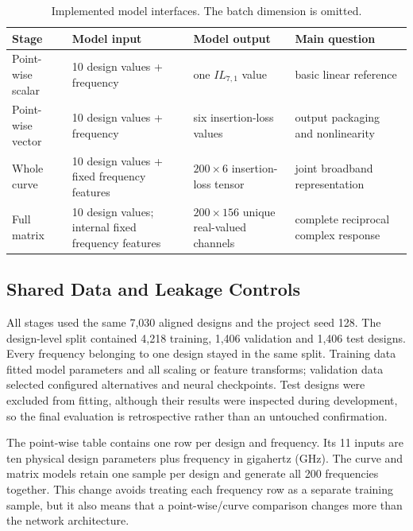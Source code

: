 \begin{table}[t]
    \caption{Implemented model interfaces. The batch dimension is omitted.}
    \label{tab:appendix-d-interfaces}
    \centering
    \scriptsize
    \begin{tabular}{@{}llll@{}}
        \toprule
        Stage & Model input & Model output & Main question \\
        \midrule
        Point-wise scalar
          & 10 design values + frequency
          & one $IL_{7,1}$ value
          & basic linear reference \\
        Point-wise vector
          & 10 design values + frequency
          & six insertion-loss values
          & output packaging and nonlinearity \\
        Whole curve
          & 10 design values + fixed frequency features
          & $200\times6$ insertion-loss tensor
          & joint broadband representation \\
        Full matrix
          & 10 design values; internal fixed frequency features
          & $200\times156$ unique real-valued channels
          & complete reciprocal complex response \\
        \bottomrule
    \end{tabular}
\end{table}

\subsection{Shared Data and Leakage Controls}
All stages used the same 7,030 aligned designs and the project seed 128. The
design-level split contained 4,218 training, 1,406 validation and 1,406 test
designs. Every frequency belonging to one design stayed in the same split.
Training data fitted model parameters and all scaling or feature transforms;
validation data selected configured alternatives and neural checkpoints. Test
designs were excluded from fitting, although their results were inspected
during development, so the final evaluation is retrospective rather than an
untouched confirmation.

The point-wise table contains one row per design and frequency. Its 11 inputs
are ten physical design parameters plus frequency in gigahertz (GHz). The curve
and matrix models retain one sample per design and generate all 200 frequencies
together. This change avoids treating each frequency row as a separate training
sample, but it also means that a point-wise/curve comparison changes more than
the network architecture.

